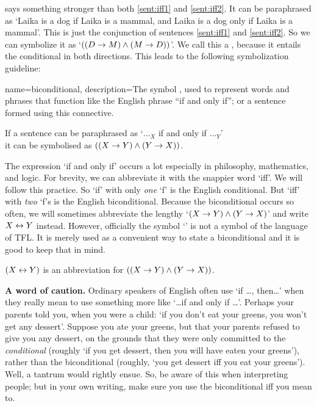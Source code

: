  says something stronger than both \cref{sent:iff1} and \cref{sent:iff2}. It can be paraphrased as `Laika is a dog if Laika is a mammal, and Laika is a dog only if Laika is a mammal'. This is just the conjunction of sentences \ref{sent:iff1} and \ref{sent:iff2}. So we can symbolize it as `$((D \rightarrow M) \mathbin{\wedge} (M \rightarrow D))$'. We call this a , because it entails the conditional in both directions. This leads to the following symbolization guideline:

{
name=biconditional,
description={The symbol \eiff, used to represent words and phrases that function like the English phrase ``if and only if''; or a sentence formed using this connective.}}


\begin{highlighted}
If a sentence can be paraphrased as `$\ldots_X$ if and only if $\ldots_Y$'\\ it can be symbolised as $((X\rightarrow Y)\mathbin{\wedge}(Y\rightarrow X))$.
	\end{highlighted}
The expression `if and only if' occurs a lot especially in philosophy, mathematics, and logic. For brevity, we can abbreviate it with the snappier word `iff'. We will follow this practice. So `if' with only \emph{one} `f' is the English conditional. But `iff' with \emph{two} `f's is the English biconditional. Because the biconditional occurs so often, we will sometimes abbreviate the lengthy `$(X\rightarrow Y)\mathbin{\wedge}(Y\rightarrow X)$' and write $X\leftrightarrow Y$ instead. However, officially the symbol `\eiff' is not a symbol of the language of TFL. It is merely used as a convenient way to state a biconditional and it is good to keep that in mind.

\begin{highlighted}
	$(X\leftrightarrow Y)$ is an abbreviation for $((X\rightarrow Y)\mathbin{\wedge}(Y\rightarrow X))$.
\end{highlighted}

\textbf{A word of caution.} Ordinary speakers of English often use `if \ldots, then\ldots' when they really mean to use something more like `\ldots if and only if \ldots'. Perhaps your parents told you, when you were a child: `if you don't eat your greens, you won't get any dessert'. Suppose you ate your greens, but that your parents refused to give you any dessert, on the grounds that they were only committed to the \emph{conditional} (roughly `if you get dessert, then you will have eaten your greens'), rather than the biconditional (roughly, `you get dessert iff you eat your greens'). Well, a tantrum would rightly ensue. So, be aware of this when interpreting people; but in your own writing, make sure you use the biconditional iff you mean to.

